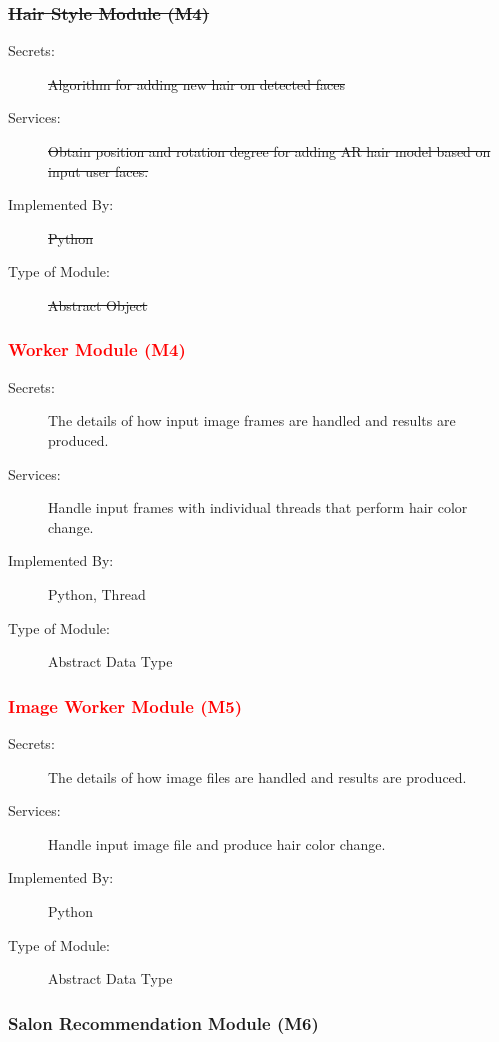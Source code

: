 \documentclass[12pt, titlepage]{article}
\begin{document}
\subsubsection{\sout{Hair Style Module (M4)}}

\begin{description}
\item[Secrets:]\sout{Algorithm for adding new hair on detected faces}
\item[Services:]\sout{Obtain position and rotation degree for adding AR hair model based on input user faces.}
\item[Implemented By:] \sout{Python}
\item[Type of Module:] \sout{Abstract Object}
\end{description}

\color{red}
\subsubsection{\textcolor{red}{Worker Module (M4)}}

\begin{description}
\item[Secrets:] The details of how input image frames are handled and results are produced.
\item[Services:] Handle input frames with individual threads that perform hair color change.
\item[Implemented By:] Python, Thread
\item[Type of Module:] Abstract Data Type
\end{description}

\subsubsection{\textcolor{red}{Image Worker Module (M5)}}

\begin{description}
\item[Secrets:] The details of how image files are handled and results are produced.
\item[Services:] Handle input image file and produce hair color change.
\item[Implemented By:] Python
\item[Type of Module:] Abstract Data Type
\end{description}

\color{black}
\subsubsection{Salon Recommendation Module (M6)}
\end{document}
